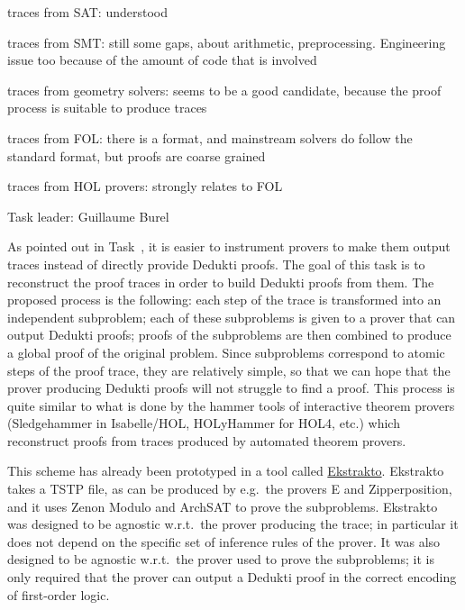 \begin{workpackage}
\begin{tasklist}
\begin{task}[id=instrumenting, title=Instrumenting ATPs to produce
  traces]
traces from SAT: understood

traces from SMT: still some gaps, about arithmetic, preprocessing.  Engineering issue too because of the amount of code that is involved

traces from geometry solvers: seems to be a good candidate, because the proof process is suitable to produce traces

traces from FOL: there is a format, and mainstream solvers do follow the standard format, but proofs are coarse grained

traces from HOL provers: strongly relates to FOL

\end{task}


\begin{task}[id=tracetodedukti, title=Translate ATP traces into Dedukti]
  Task leader: Guillaume Burel

As pointed out in Task~, it is easier to
instrument provers to make them output traces instead of directly
provide Dedukti proofs. The goal of this task is to reconstruct the
proof traces in order to build Dedukti proofs from them. The proposed
process is the following: each step of the trace is transformed into
an independent subproblem; each of these subproblems is given to a
prover that can output Dedukti proofs; proofs of the subproblems are
then combined to produce a global proof of the original problem. Since
subproblems correspond to atomic steps of the proof trace, they are
relatively simple, so that we can hope that the prover producing
Dedukti proofs will not struggle to find a proof. This process is
quite similar to what is done by the hammer tools of interactive
theorem provers (Sledgehammer in Isabelle/HOL, HOLyHammer for HOL4, etc.)
which reconstruct proofs from traces produced by automated theorem
provers.

This scheme has already been prototyped in a tool called
\href{https://github.com/Deducteam/ekstrakto}{Ekstrakto}. Ekstrakto takes a TSTP
file, as can be produced by e.g.\ the provers E and Zipperposition, and it uses
Zenon Modulo and ArchSAT to prove the subproblems. Ekstrakto was designed to be
agnostic w.r.t.\ the prover producing the trace; in particular it does not
depend on the specific set of inference rules of the prover. It was also
designed to be agnostic w.r.t.\ the prover used to prove the subproblems; it is
only required that the prover can output a Dedukti proof in the correct encoding
of first-order logic.


\end{task}
\end{tasklist}
\end{workpackage}
